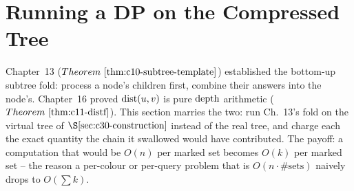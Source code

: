 \section{Running a DP on the Compressed Tree}\label{sec:c30-dp}

\begin{previouslybox}
Chapter~13 (\(\thmref{c10-subtree-template}\)) established the bottom-up subtree
fold: process a node's children first, combine their answers into the node's.
Chapter~16 proved \(\operatorname{dist}(u,v)\) is pure \(\operatorname{depth}\) arithmetic
(\(\thmref{c11-distf}\)).  This section marries the two: run Ch.~13's fold on the
virtual tree of \(\secref{c30-construction}\) instead of the real tree, and charge
each  the exact quantity the chain it swallowed would have
contributed.  The payoff: a computation that would be \(O(n)\) per marked set
becomes \(O(k)\) per marked set -- the reason a per-colour or per-query problem that
is \(O(n\cdot\#\text{sets})\) naively drops to \(O(\sum k)\).
\end{previouslybox}

